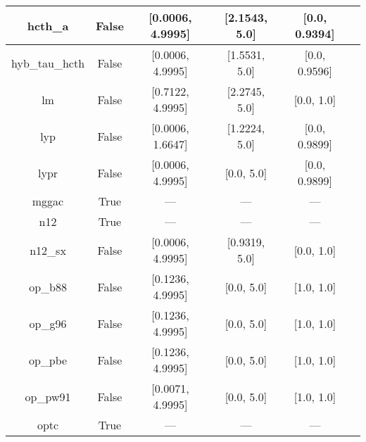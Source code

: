 \begin{tabular}{|c|c|c|c|c|l|}
       hcth\_a &                 False & [0.0006, 4.9995] &    [2.1543, 5.0] &  [0.0, 0.9394] &                                      \cite{Hamprecht1998_6264} \\ \hline
hyb\_tau\_hcth &                 False & [0.0006, 4.9995] &    [1.5531, 5.0] &  [0.0, 0.9596] &                                          \cite{Boese2002_9559} \\ \hline
            lm &                 False & [0.7122, 4.9995] &    [2.2745, 5.0] &     [0.0, 1.0] &                             \cite{Langreth1981_446,Hu1985_391} \\ \hline
           lyp &                 False & [0.0006, 1.6647] &    [1.2224, 5.0] &  [0.0, 0.9899] &                            \cite{Lee1988_785,Miehlich1989_200} \\ \hline
          lypr &                 False & [0.0006, 4.9995] &       [0.0, 5.0] &  [0.0, 0.9899] &                                             \cite{Ai2021_1207} \\ \hline
         mggac &                  True &              --- &              --- &            --- &                                        \cite{Patra2019_155140} \\ \hline
           n12 &                  True &              --- &              --- &            --- &                                       \cite{Peverati2012_2310} \\ \hline
       n12\_sx &                 False & [0.0006, 4.9995] &    [0.9319, 5.0] &     [0.0, 1.0] &                                      \cite{Peverati2012_16187} \\ \hline
       op\_b88 &                 False & [0.1236, 4.9995] &       [0.0, 5.0] &     [1.0, 1.0] &                                       \cite{Tsuneda1999_10664} \\ \hline
       op\_g96 &                 False & [0.1236, 4.9995] &       [0.0, 5.0] &     [1.0, 1.0] &                      \cite{Tsuneda1999_10664,Tsuneda1999_5656} \\ \hline
       op\_pbe &                 False & [0.1236, 4.9995] &       [0.0, 5.0] &     [1.0, 1.0] &                      \cite{Tsuneda1999_10664,Tsuneda1999_5656} \\ \hline
      op\_pw91 &                 False & [0.0071, 4.9995] &       [0.0, 5.0] &     [1.0, 1.0] &                      \cite{Tsuneda1999_10664,Tsuneda1999_5656} \\ \hline
          optc &                  True &              --- &              --- &            --- &                                           \cite{Cohen2001_607} \\ \hline

\end{tabular}
